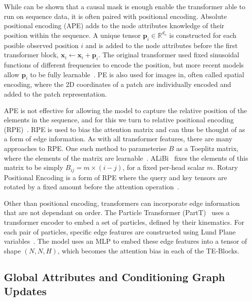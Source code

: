 While can be shown that a causal mask is enough enable the transformer able to run on sequence data, it is often paired with positional encoding.
Absolute positional encoding (APE) adds to the node attributes knowledge of their position within the sequence.
A unique tensor $\mathbf{p}_i \in \mathbb{R}^{d_x}$ is constructed for each posible observed position $i$ and is added to the node attributes before the first transformer block, $\mathbf{x}_i \leftarrow \mathbf{x}_i + \mathbf{p}_i$.
The original transformer used fixed sinusoidal functions of different frequencies to encode the position, but more recent models allow $\mathbf{p}_i$ to be fully learnable~.
PE is also used for images in, often called spatial encoding, where the 2D coordinates of a patch are individually encoded and added to the patch representation.

APE is not effective for allowing the model to capture the relative position of the elements in the sequence, and for this we turn to relative positional encoding (RPE)~.
RPE is used to bias the attention matrix and can thus be thought of as a form of edge information.
As with all transformer features, there are many approaches to RPE.
One such method to parameterise $B$ as a Toeplitz matrix, where the elements of the matrix are learnable~.
ALiBi~ fixes the elements of this matrix to be simply $B_{ij} = m\times(i - j)$, for a fixed per-head scalar $m$.
Rotary Positional Encoding is a form of RPE where the query and key tensors are rotated by a fixed amount before the attention operation~.

Other than positional encoding, transformers can incorporate edge information that are not dependant on order.
The Particle Transformer (PartT)~ uses a transformer encoder to embed a set of particles, defined by their kinematics.
For each pair of particles, specific edge features are constructed using Lund Plane variables~.
The model uses an MLP to embed these edge features into a tensor of shape $(N, N, H)$, which becomes the attention bias in each of the TE-Blocks.

\subsection{Global Attributes and Conditioning Graph Updates}

